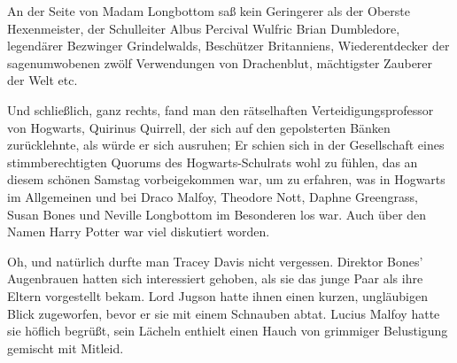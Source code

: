 An der Seite von Madam Longbottom saß kein Geringerer als der Oberste Hexenmeister, der Schulleiter Albus Percival Wulfric Brian Dumbledore, legendärer Bezwinger Grindelwalds, Beschützer Britanniens, Wiederentdecker der sagenumwobenen zwölf Verwendungen von Drachenblut, mächtigster Zauberer der Welt etc.

Und schließlich, ganz rechts, fand man den rätselhaften Verteidigungsprofessor von Hogwarts, Quirinus Quirrell, der sich auf den gepolsterten Bänken zurücklehnte, als würde er sich ausruhen; Er schien sich in der Gesellschaft eines stimmberechtigten Quorums des Hogwarts-Schulrats wohl zu fühlen, das an diesem schönen Samstag vorbeigekommen war, um zu erfahren, was in Hogwarts im Allgemeinen und bei Draco Malfoy, Theodore Nott, Daphne Greengrass, Susan Bones und Neville Longbottom im Besonderen los war. Auch über den Namen Harry Potter war viel diskutiert worden.

Oh, und natürlich durfte man Tracey Davis nicht vergessen. Direktor Bones' Augenbrauen hatten sich interessiert gehoben, als sie das junge Paar als ihre Eltern vorgestellt bekam. Lord Jugson hatte ihnen einen kurzen, ungläubigen Blick zugeworfen, bevor er sie mit einem Schnauben abtat. Lucius Malfoy hatte sie höflich begrüßt, sein Lächeln enthielt einen Hauch von grimmiger Belustigung gemischt mit Mitleid.

